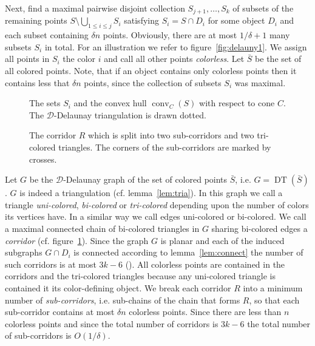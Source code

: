 \documentclass{stacs_proc}
\newcommand{\bigO}{O}
\newcommand{\D}{\mathcal{D}}
\DeclareMathOperator{\DT}{DT}
\DeclareMathOperator{\con}{conv}
\begin{document}
Next, find a maximal pairwise disjoint collection $S_{j+1}, \ldots , S_k$
of subsets of the remaining points $S\setminus \bigcup_{1\leq i\leq j} S_i$ satisfying
$S_i=S\cap D_i$ for some object $D_i$ and each subset containing $\delta n$
points. Obviously, there are at most $1/ \delta +1$ many subsets $S_i$ in
total. 
For an illustration we refer to figure~\ref{fig:delauny1}. 
We assign all points in $S_i$ the color $i$ and call all other points
\emph{colorless}. Let $\bar{S}$ be the set of all colored points. 
Note, that if an object contains only colorless points then it
contains less that $\delta n$ points, since the collection of subsets $S_i$
was maximal. 
\begin{figure}
\begin{minipage}{0.49\textwidth}
  \begin{center}
    \caption{The sets $S_i$ and the convex hull $\con_C(S)$ with
      respect to cone $C$. The $\D$-Delaunay triangulation is drawn
      dotted.} 
    \label{fig:delauny1}
  \end{center}
\end{minipage}\hfill
\begin{minipage}{0.49\textwidth}
  \begin{center}
    \caption{The corridor $R$ which is split into two sub-corridors
      and two tri-colored triangles. The corners of the sub-corridors
      are marked by crosses.} 
    \label{fig:delauny2}
  \end{center}
\end{minipage}
\end{figure}

Let $G$ be the $\D$-Delaunay graph of the set of colored points
$\bar{S}$, i.e. $G=\DT(\bar{S})$. $G$ is indeed a triangulation
(cf. lemma~\ref{lem:tria}). In this graph we call a triangle
\emph{uni-colored}, \emph{bi-colored} or \emph{tri-colored} depending
upon the number of colors its vertices have. In a similar way we call
edges uni-colored or bi-colored. We call a maximal connected chain of
bi-colored triangles in $G$ sharing bi-colored edges a \emph{corridor}
(cf. figure~\ref{fig:delauny2}).  
Since the graph $G$ is planar and each of the induced subgraphs $G\cap
D_i$ is connected according to lemma~\ref{lem:connect} the number of
such corridors is at most $3k-6$ (\cite{MSW90}). All colorless points
are contained in the corridors and the tri-colored triangles because
any uni-colored triangle is contained it its color-defining object. We
break each corridor $R$ into a minimum number of \emph{sub-corridors},
i.e. sub-chains of the chain that forms $R$, so that each sub-corridor
contains at most $\delta n$ colorless points. Since there are less than $n$
colorless points and since the total number of corridors is $3k-6$ the
total number of sub-corridors is $\bigO(1/ \delta)$.  
\end{document}
